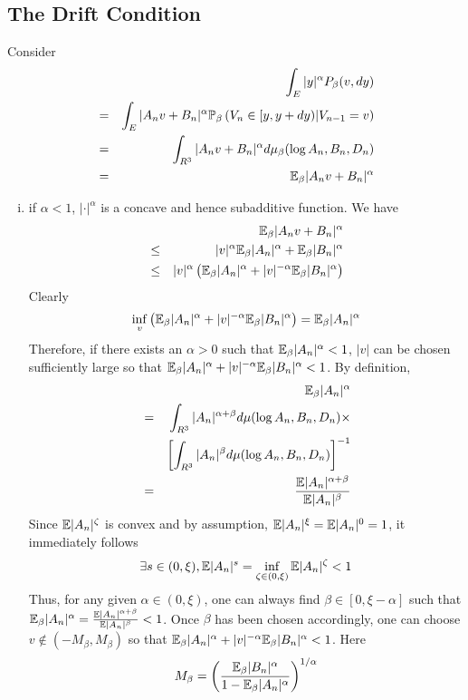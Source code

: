 \documentclass{article}
\begin{document}
\subsection{The Drift Condition}
Consider
\begin{eqnarray*}
  && \int_E |y|^\alpha P_\beta(v, dy)  \\
  &=& \int_E |A_n v + B_n|^\alpha \mathbb{P}_\beta\left(V_n \in [y, y +dy) |
  V_{n-1} = v\right) \\
&=& \int_{R^3} |A_n v + B_n|^\alpha d\mu_\beta(\log A_n, B_n, D_n) \\
&=& \mathbb{E}_\beta |A_n v + B_n|^\alpha
\end{eqnarray*}
\begin{enumerate}[(i)]
\item if $\alpha < 1$, $|\cdot|^\alpha$ is a concave and hence
  subadditive function. We have
  \begin{eqnarray*}
    && \mathbb{E}_\beta |A_n v + B_n|^\alpha    \\
    &\leq& |v|^{\alpha}\mathbb{E}_\beta|A_n|^\alpha + \mathbb{E}_\beta|B_n|^\alpha \\
    &\leq& |v|^{\alpha}\left(
      \mathbb{E}_\beta|A_n|^\alpha + |v|^{-\alpha}\mathbb{E}_\beta|B_n|^\alpha
    \right)\\
  \end{eqnarray*}
  Clearly
  \begin{eqnarray*}
    \inf_{v} \left(
      \mathbb{E}_\beta|A_n|^\alpha + |v|^{-\alpha}\mathbb{E}_\beta|B_n|^\alpha
    \right) = \mathbb{E}_\beta|A_n|^\alpha
  \end{eqnarray*}
  Therefore, if there exists an $\alpha > 0$ such that
  $\mathbb{E}_\beta|A_n|^\alpha < 1$, $|v|$ can be chosen sufficiently large
  so that $\mathbb{E}_\beta|A_n|^\alpha + |v|^{-\alpha}\mathbb{E}_\beta|B_n|^\alpha <
  1$. By definition,
  \begin{eqnarray*}
    && \mathbb{E}_\beta |A_n|^\alpha \\
    &=& \int_{R^3} |A_n|^{\alpha + \beta} d\mu(\log A_n, B_n, D_n)
    \times \\
    && \left[
      \int_{R^3} |A_n|^{\beta} d\mu(\log A_n, B_n, D_n)
    \right]^{-1} \\
    &=& {\mathbb{E} |A_n|^{\alpha + \beta} \over \mathbb{E} |A_n|^{\beta}}
  \end{eqnarray*}
  Since $\mathbb{E}|A_n|^{\zeta}$ is convex and by
  assumption, $\mathbb{E}|A_n|^{\xi} =\mathbb{E}|A_n|^0= 1$, it immediately follows
\[
\exists s \in (0, \xi), \mathbb{E} |A_n|^s = \inf_{\zeta \in (0, \xi)} \mathbb{E}
|A_n|^\zeta < 1
\]
Thus, for any given $\alpha \in (0, \xi)$, one can always find
$\beta\in [0, \xi-\alpha]$ such that $\mathbb{E}_\beta |A_n|^\alpha = {\mathbb{E}
  |A_n|^{\alpha + \beta} \over \mathbb{E} |A_n|^{\beta}} < 1$. Once $\beta$
has been chosen accordingly, one can choose $v \notin (-M_\beta,
M_\beta)$ so that $\mathbb{E}_\beta|A_n|^\alpha +
|v|^{-\alpha}\mathbb{E}_\beta|B_n|^\alpha < 1$. Here
\[
M_\beta = \left({\mathbb{E}_\beta |B_n|^\alpha \over 1 - \mathbb{E}_\beta
    |A_n|^\alpha}\right)^{1/\alpha}
\]


\end{enumerate}
\end{document}
